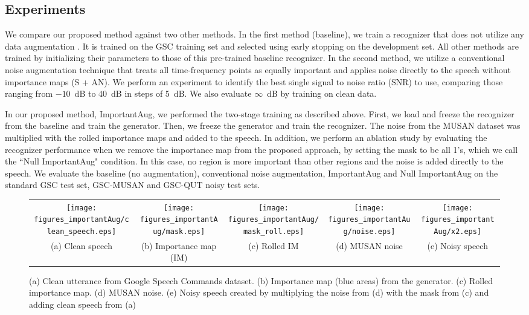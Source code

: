 \documentclass{article}
\begin{document}
\subsection{Experiments}

We compare our proposed method against two other methods. In the first method (baseline), we train a recognizer that does not utilize any data augmentation . It is trained on the GSC training set and selected using early stopping on the development set. All other methods are trained by initializing their parameters to those of this pre-trained baseline recognizer. 
In the second method, we utilize a conventional noise augmentation technique that treats all time-frequency points as equally important and applies noise directly to the speech without importance maps (S + AN). We perform an experiment to identify the best single signal to noise ratio (SNR) to use, comparing those ranging from $-10$~dB to 40~dB in steps of 5~dB. We also evaluate $\infty$~dB by training on clean data. 

In our proposed method, ImportantAug, we performed the two-stage training as described above. First, we load and freeze the recognizer from the baseline and train the generator. Then, we freeze the generator and train the recognizer. The noise from the MUSAN dataset was multiplied with the rolled importance maps and added to the speech. In addition, we perform an ablation study by evaluating the recognizer performance when we remove the importance map from the proposed approach, by setting the mask to be all 1's, which we call the ``Null ImportantAug" condition. In this case, no region is more important than other regions and the noise is added directly to the speech. 
We evaluate the baseline (no augmentation), conventional noise augmentation, ImportantAug and Null ImportantAug on the standard GSC test set, GSC-MUSAN and GSC-QUT noisy test sets. 

\begin{figure*}
  \begin{center}
    \scriptsize
    \begin{tabular}{ccccc}
      \texttt{[image: figures\_importantAug/clean\_speech.eps]} &
      \texttt{[image: figures\_importantAug/mask.eps]} &
      \texttt{[image: figures\_importantAug/mask\_roll.eps]} &
      \texttt{[image: figures\_importantAug/noise.eps]} &
      \texttt{[image: figures\_importantAug/x2.eps]} \\
      (a) Clean speech &
      (b) Importance map (IM) &
      (c) Rolled IM &
      (d) MUSAN noise &
      (e) Noisy speech \\
    \end{tabular}
  \end{center}
  \caption{
  (a) Clean utterance from Google Speech Commands dataset. (b) Importance map (blue areas) from the generator. (c) Rolled importance map. (d) MUSAN noise. (e) Noisy speech created by multiplying the noise from (d) with the mask from (c) and adding clean speech from (a) }
  \label{fig:Important_aug_process}
\end{figure*}
\end{document}
